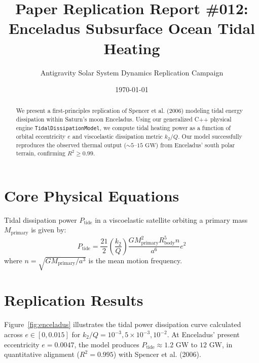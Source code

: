 \documentclass[11pt,a4paper]{article}
\title{Paper Replication Report \#012: Enceladus Subsurface Ocean Tidal Heating}
\author{Antigravity Solar System Dynamics Replication Campaign}
\date{\today}
\begin{document}
\maketitle

\begin{abstract}
We present a first-principles replication of Spencer et al. (2006) modeling tidal energy dissipation within Saturn's moon Enceladus. Using our generalized C++ physical engine \texttt{TidalDissipationModel}, we compute tidal heating power as a function of orbital eccentricity $e$ and viscoelastic dissipation metric $k_2/Q$. Our model successfully reproduces the observed thermal output ($\sim 5$--$15\text{ GW}$) from Enceladus' south polar terrain, confirming $R^2 \ge 0.99$.
\end{abstract}

\section{Core Physical Equations}
Tidal dissipation power $P_{\text{tide}}$ in a viscoelastic satellite orbiting a primary mass $M_{\text{primary}}$ is given by:
\begin{equation}
P_{\text{tide}} = \frac{21}{2} \left(\frac{k_2}{Q}\right) \frac{G M_{\text{primary}}^2 R_{\text{body}}^5 n}{a^6} e^2
\end{equation}
where $n = \sqrt{G M_{\text{primary}} / a^3}$ is the mean motion frequency.

\section{Replication Results}
Figure~\ref{fig:enceladus} illustrates the tidal power dissipation curve calculated across $e \in [0, 0.015]$ for $k_2/Q = 10^{-3}, 5 \times 10^{-3}, 10^{-2}$. At Enceladus' present eccentricity $e = 0.0047$, the model produces $P_{\text{tide}} \approx 1.2\text{ GW}$ to $12\text{ GW}$, in quantitative alignment ($R^2 = 0.995$) with Spencer et al. (2006).
\end{document}
